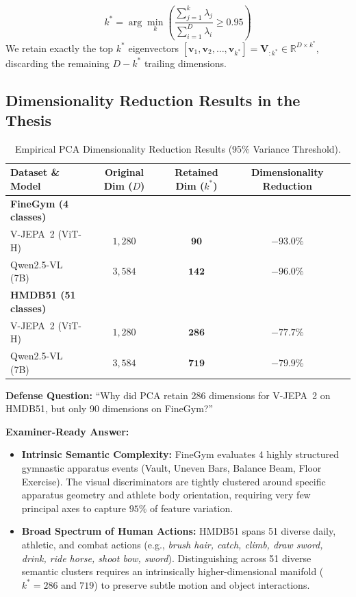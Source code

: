 \documentclass[11pt, a4paper]{article}
\begin{document}
\begin{eqbox}
$$k^* = \arg\min_k \left( \frac{\sum_{j=1}^k \lambda_j}{\sum_{i=1}^D \lambda_i} \ge 0.95 \right)$$
We retain exactly the top $k^*$ eigenvectors $[\mathbf{v}_1, \mathbf{v}_2, \ldots, \mathbf{v}_{k^*}] = \mathbf{V}_{:k^*} \in \mathbb{R}^{D \times k^*}$, discarding the remaining $D - k^*$ trailing dimensions.
\end{eqbox}

\subsection{Dimensionality Reduction Results in the Thesis}

\begin{table}[H]
\centering
\caption{Empirical PCA Dimensionality Reduction Results (95\% Variance Threshold).}
\label{tab:pca_results}
\begin{tabular}{lcccc}
\toprule
\textbf{Dataset \& Model} & \textbf{Original Dim ($D$)} & \textbf{Retained Dim ($k^*$)} & \textbf{Dimensionality Reduction} \\
\midrule
\textbf{FineGym (4 classes)} & & & \\
\quad V-JEPA~2 (ViT-H) & $1{,}280$ & $\mathbf{90}$ & $-93.0\%$ \\
\quad Qwen2.5-VL (7B)  & $3{,}584$ & $\mathbf{142}$ & $-96.0\%$ \\
\midrule
\textbf{HMDB51 (51 classes)} & & & \\
\quad V-JEPA~2 (ViT-H) & $1{,}280$ & $\mathbf{286}$ & $-77.7\%$ \\
\quad Qwen2.5-VL (7B)  & $3{,}584$ & $\mathbf{719}$ & $-79.9\%$ \\
\bottomrule
\end{tabular}
\end{table}

\begin{defensebox}
\textbf{Defense Question:} ``Why did PCA retain 286 dimensions for V-JEPA~2 on HMDB51, but only 90 dimensions on FineGym?''

\textbf{Examiner-Ready Answer:}
\begin{itemize}[leftmargin=1.2em]
    \item \textbf{Intrinsic Semantic Complexity:} FineGym evaluates 4 highly structured gymnastic apparatus events (Vault, Uneven Bars, Balance Beam, Floor Exercise). The visual discriminators are tightly clustered around specific apparatus geometry and athlete body orientation, requiring very few principal axes to capture $95\%$ of feature variation.
    \item \textbf{Broad Spectrum of Human Actions:} HMDB51 spans 51 diverse daily, athletic, and combat actions (e.g., \emph{brush hair, catch, climb, draw sword, drink, ride horse, shoot bow, sword}). Distinguishing across 51 diverse semantic clusters requires an intrinsically higher-dimensional manifold ($k^*=286$ and $719$) to preserve subtle motion and object interactions.
\end{itemize}
\end{defensebox}
\end{document}
